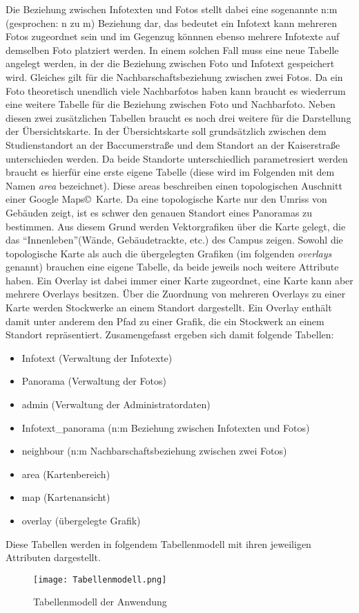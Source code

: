 Die Beziehung zwischen Infotexten und Fotos stellt dabei eine sogenannte n:m (gesprochen: n zu m) Beziehung dar, das bedeutet ein Infotext kann mehreren Fotos zugeordnet sein und im Gegenzug könnnen ebenso mehrere Infotexte auf demselben Foto platziert werden. In einem solchen Fall muss eine neue Tabelle angelegt werden, in der die Beziehung zwischen Foto und Infotext gespeichert wird. Gleiches gilt für die Nachbarschaftsbeziehung zwischen zwei Fotos. Da ein Foto theoretisch unendlich viele Nachbarfotos haben kann braucht es wiederrum eine weitere Tabelle für die Beziehung zwischen Foto und Nachbarfoto. Neben diesen zwei zusätzlichen Tabellen braucht es noch drei weitere für die Darstellung der Übersichtskarte. In der Übersichtskarte soll grundsätzlich zwischen dem Studienstandort an der Baccumerstraße und dem Standort an der Kaiserstraße unterschieden werden. Da beide Standorte unterschiedlich parametresiert werden braucht es hierfür eine erste eigene Tabelle (diese wird im Folgenden mit dem Namen \textit{area} bezeichnet). Diese areas beschreiben einen topologischen Auschnitt einer Google Maps\copyright\ Karte. Da eine topologische Karte nur den Umriss von Gebäuden zeigt, ist es schwer den genauen Standort eines Panoramas zu bestimmen. Aus diesem Grund werden Vektorgrafiken über die Karte gelegt, die das "`Innenleben"'(Wände, Gebäudetrackte, etc.) des Campus zeigen. Sowohl die topologische Karte als auch die übergelegten Grafiken (im folgenden \textit{overlays} genannt) brauchen eine eigene Tabelle, da beide jeweils noch weitere Attribute haben. Ein Overlay ist dabei immer einer Karte zugeordnet, eine Karte kann aber mehrere Overlays besitzen. Über die Zuordnung von mehreren Overlays zu einer Karte werden Stockwerke an einem Standort dargestellt. Ein Overlay enthält damit unter anderem den Pfad zu einer Grafik, die ein Stockwerk an einem Standort repräsentiert. Zusamengefasst ergeben sich damit folgende Tabellen:

\begin{itemize}
  \item Infotext (Verwaltung der Infotexte)
  \item Panorama (Verwaltung der Fotos)
  \item admin (Verwaltung der Administratordaten)
  \item Infotext\_panorama (n:m Beziehung zwischen Infotexten und Fotos)
  \item neighbour (n:m Nachbarschaftsbeziehung zwischen zwei Fotos)
  \item area (Kartenbereich)
  \item map (Kartenansicht)
  \item overlay (übergelegte Grafik)
\end{itemize}

Diese Tabellen werden in folgendem Tabellenmodell mit ihren jeweiligen Attributen dargestellt.

\begin{figure}[htb]
\centering
\texttt{[image: Tabellenmodell.png]}
\caption[Tabellenmodell der Anwendung]{Tabellenmodell der Anwendung\protect\footnotemark}
\label{fig:Tabellenmodell}
\end{figure}
